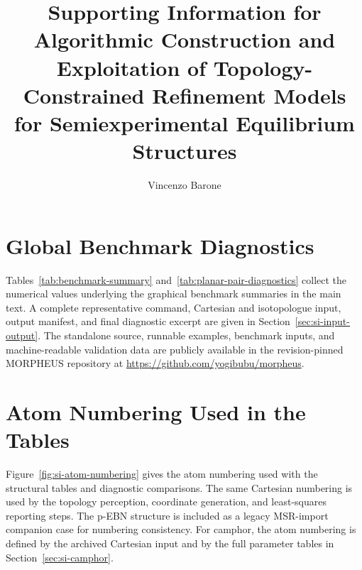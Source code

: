 \documentclass[12pt]{article}
\title{Supporting Information for\\
Algorithmic Construction and Exploitation of Topology-Constrained Refinement Models for Semiexperimental Equilibrium Structures}
\author{Vincenzo Barone}
\date{}
\begin{document}
\maketitle

\section{Global Benchmark Diagnostics}

Tables~\ref{tab:benchmark-summary} and~\ref{tab:planar-pair-diagnostics}
collect the numerical values underlying the graphical benchmark summaries in
the main text. A complete representative command, Cartesian and isotopologue
input, output manifest, and final diagnostic excerpt are given in
Section~\ref{sec:si-input-output}. The standalone source, runnable examples,
benchmark inputs, and machine-readable validation data are publicly available
in the revision-pinned MORPHEUS repository at
\url{https://github.com/yogibubu/morpheus}.





\section{Atom Numbering Used in the Tables}

Figure~\ref{fig:si-atom-numbering} gives the atom numbering used with the
structural tables and diagnostic comparisons. The same Cartesian numbering is
used by the topology perception, coordinate generation, and least-squares
reporting steps. The p-EBN structure is included as a legacy MSR-import
companion case for numbering consistency. For camphor, the atom numbering is
defined by the archived Cartesian input and by the full parameter tables in
Section~\ref{sec:si-camphor}.
\end{document}
